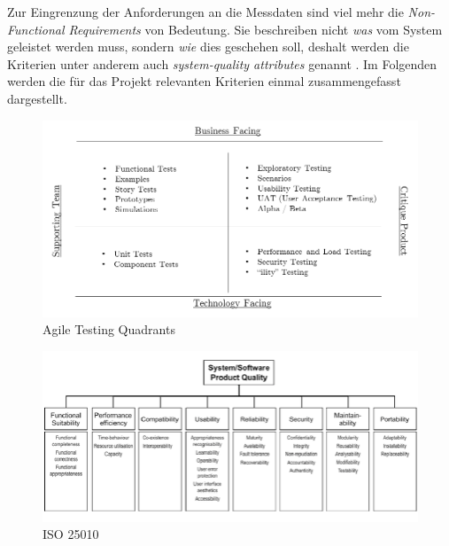 Zur Eingrenzung der Anforderungen an die Messdaten sind viel mehr die \emph{Non-Functional Requirements} von Bedeutung. Sie beschreiben nicht \emph{was} vom System geleistet werden muss, sondern \emph{wie} dies geschehen soll, deshalt werden die Kriterien unter anderem auch \emph{system-quality attributes} genannt \cite[Seite~335]{continuous-delivery}. Im Folgenden werden die für das Projekt relevanten Kriterien einmal zusammengefasst dargestellt.

\begin{figure}[h!]
	\centering
	\includegraphics[width=\linewidth]{kapitel/vorgehensmodell/kriterienkatalog/_img/agile-testing-quadrants}
	\caption[Agile Testing Quadrants]{Agile Testing Quadrants}
	\label{fig:testing-quad}
\end{figure}

\begin{figure}[h!]
	\centering
	\includegraphics[width=\linewidth]{kapitel/vorgehensmodell/kriterienkatalog/_img/iso25010}
	\caption[iso25010]{ISO 25010}
	\label{fig:iso25010}
\end{figure}



